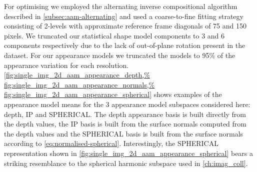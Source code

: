 For optimising we employed the alternating inverse
compositional algorithm described in \cref{subsec:aam-alternating} and used a
coarse-to-fine fitting strategy consisting of 2-levels with approximate
reference frame diagonals of 75 and 150 pixels. We truncated our statistical
shape model components to 3 and 6 components respectively due to the lack
of out-of-plane rotation present in the dataset. For our appearance models
we truncated the models to 95\% of the appearance variation for each resolution.
\cref{fig:single_img_2d_aam_appearance_depth,%
      fig:single_img_2d_aam_appearance_normals,%
      fig:single_img_2d_aam_appearance_spherical}
shows examples of the appearance model
means for the 3 appearance model subspaces considered here: depth, IP and
SPHERICAL. The depth appearance basis is built directly from the depth values,
the IP basis is built from the surface normals computed from the depth values
and the SPHERICAL basis is built from the surface normals according
to \cref{eq:normalised-spherical}. Interestingly, the SPHERICAL representation
shown in \cref{fig:single_img_2d_aam_appearance_spherical} bears a striking
resemblance to the spherical harmonic subspace used in \cref{ch:imag_coll}.
\setlength{\tabcolsep}{2pt}
